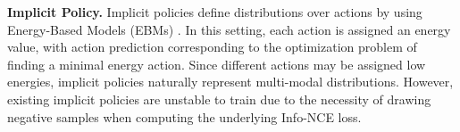 

\textbf{Implicit Policy.}
Implicit policies \citep{ibc, jarrett2020strictly} define distributions over actions by using Energy-Based Models (EBMs) \citep{lecun06atutorial, du2019implicit, dai2019exponential, grathwohl2020stein, du2020improved}. 
In this setting, each action is assigned an energy value, with action prediction corresponding to the optimization problem of finding a minimal energy action. Since different actions may be assigned low energies, implicit policies naturally represent multi-modal distributions. However, existing implicit policies \citep{ibc} are unstable to train due to the necessity of drawing negative samples when computing the underlying Info-NCE loss. %




